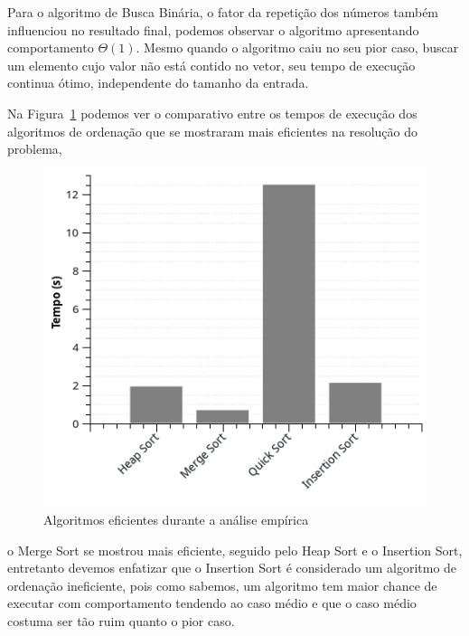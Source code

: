   Para o algoritmo de Busca Binária, o fator da repetição dos números também influenciou no resultado final, podemos observar o algoritmo apresentando comportamento $\Theta(1)$. Mesmo quando o algoritmo caiu no seu pior caso, buscar um elemento cujo valor não está contido no vetor, seu tempo de execução continua ótimo, independente do tamanho da entrada.

  Na Figura~\ref{fig:eficientes} podemos ver o comparativo entre os tempos de execução dos algoritmos de ordenação que se mostraram mais eficientes na resolução do problema,
\begin{figure}[ht]
\centering
\includegraphics[scale=0.9]{images/eficientes_graph.jpg}
\caption{Algoritmos eficientes durante a análise empírica}
\label{fig:eficientes}
\end{figure}
o Merge Sort se mostrou mais eficiente, seguido pelo Heap Sort e o Insertion Sort, entretanto devemos enfatizar que o Insertion Sort é considerado um algoritmo de ordenação ineficiente, pois como sabemos, um algoritmo tem maior chance de executar com comportamento tendendo ao caso médio e que o caso médio costuma ser tão ruim quanto o pior caso.


